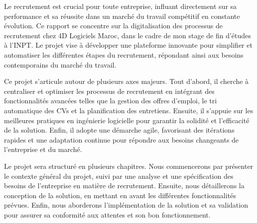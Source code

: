 Le recrutement est crucial pour toute entreprise, influant directement sur sa performance et sa réussite dans un marché du travail compétitif en constante évolution. Ce rapport se concentre sur la digitalisation des processus de recrutement chez 4D Logiciels Maroc, dans le cadre de mon stage de fin d'études à l'INPT. Le projet vise à développer une plateforme innovante pour simplifier et automatiser les différentes étapes du recrutement, répondant ainsi aux besoins contemporains du marché du travail.
\newline

Ce projet s'articule autour de plusieurs axes majeurs. Tout d'abord, il cherche à centraliser et optimiser les processus de recrutement en intégrant des fonctionnalités avancées telles que la gestion des offres d'emploi, le tri automatique des CVs et la planification des entretiens. Ensuite, il s'appuie sur les meilleures pratiques en ingénierie logicielle pour garantir la solidité et l'efficacité de la solution. Enfin, il adopte une démarche agile, favorisant des itérations rapides et une adaptation continue pour répondre aux besoins changeants de l'entreprise et du marché.
\newline

Le projet sera structuré en plusieurs chapitres. Nous commencerons par présenter le contexte général du projet, suivi par une analyse et une spécification des besoins de l'entreprise en matière de recrutement. Ensuite, nous détaillerons la conception de la solution, en mettant en avant les différentes fonctionnalités prévues. Enfin, nous aborderons l'implémentation de la solution et sa validation pour assurer sa conformité aux attentes et son bon fonctionnement.
\newline
